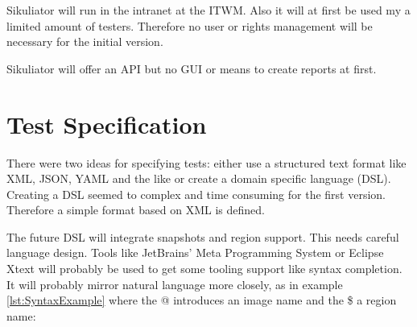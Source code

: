\documentclass[a4paper,twocolumn]{article}
\begin{document}
Sikuliator will run in the intranet at the ITWM.
Also it will at first be used my a limited amount of testers.
Therefore no user or rights management will be necessary for the initial version.

Sikuliator will offer an API but no GUI or means to create reports at first.


%

%
%

\section{Test Specification}
There were two ideas for specifying tests: either use a structured text format like XML, JSON, YAML and the like or create a domain specific language (DSL).
Creating a DSL seemed to complex and time consuming for the first version.
Therefore a simple format based on XML is defined.

The future DSL will integrate snapshots and region support.
This needs careful language design.
Tools like JetBrains' Meta Programming System\cite{MPS}
or Eclipse Xtext\cite{Xtext} will probably be used to get some tooling support like syntax completion.
It will probably mirror natural language more closely, 
as in example \ref{lst:SyntaxExample} where the @ introduces an image name and the \$ a region name:
\end{document}
